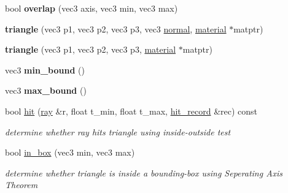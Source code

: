 \begin{DoxyCompactItemize}
\item 
\mbox{\label{classtriangle_a59813fc729a711859e0df36028d2d2d6}} 
bool {\bfseries overlap} (vec3 axis, vec3 min, vec3 max)
\item 
\mbox{\label{classtriangle_afe8b844c6cbb2a851ed3d611069446fd}} 
{\bfseries triangle} (vec3 p1, vec3 p2, vec3 p3, vec3 \hyperlink{classtriangle_ac0103b1d5b30325a6b785b50bd9eba8a}{normal}, \hyperlink{classmaterial}{material} $\ast$matptr)
\item 
\mbox{\label{classtriangle_a3c3df992e857457a9ac360f858180b1e}} 
{\bfseries triangle} (vec3 p1, vec3 p2, vec3 p3, \hyperlink{classmaterial}{material} $\ast$matptr)
\item 
\mbox{\label{classtriangle_ac18d5da9f057e8531cc24c2c800d5042}} 
vec3 {\bfseries min\+\_\+bound} ()
\item 
\mbox{\label{classtriangle_a956f30e917b4f1b0fac36044a566b57f}} 
vec3 {\bfseries max\+\_\+bound} ()
\item 
\mbox{\label{classtriangle_a47af01f4325462cc2a86bd4dcb61d8cf}} 
bool \hyperlink{classtriangle_a47af01f4325462cc2a86bd4dcb61d8cf}{hit} (\hyperlink{classray}{ray} \&r, float t\+\_\+min, float t\+\_\+max, \hyperlink{structhit__record}{hit\+\_\+record} \&rec) const
\begin{DoxyCompactList}\small\item\em determine whether ray hits triangle using inside-\/outside test \end{DoxyCompactList}\item 
\mbox{\label{classtriangle_acc11a7da8ab72f36669b5c3f1094925b}} 
bool \hyperlink{classtriangle_acc11a7da8ab72f36669b5c3f1094925b}{in\+\_\+box} (vec3 min, vec3 max)
\begin{DoxyCompactList}\small\item\em determine whether triangle is inside a bounding-\/box using Seperating Axis Theorem \end{DoxyCompactList}\end{DoxyCompactItemize}
